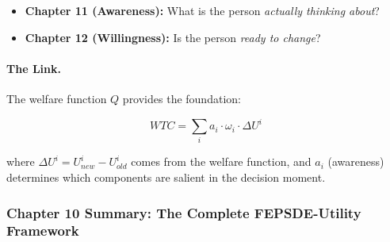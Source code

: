 \begin{itemize}
\item \textbf{Chapter 11 (Awareness):} What is the person \emph{actually thinking about}?
\item \textbf{Chapter 12 (Willingness):} Is the person \emph{ready to change}?
\end{itemize}

\paragraph{The Link.}
The welfare function $Q$ provides the foundation:

\begin{equation}
WTC = \sum_i a_i \cdot \omega_i \cdot \Delta U^i
\end{equation}

where $\Delta U^i = U^i_{new} - U^i_{old}$ comes from the welfare function, 
and $a_i$ (awareness) determines which components are salient in the decision moment.

\subsubsection{Chapter 10 Summary: The Complete FEPSDE-Utility Framework}

